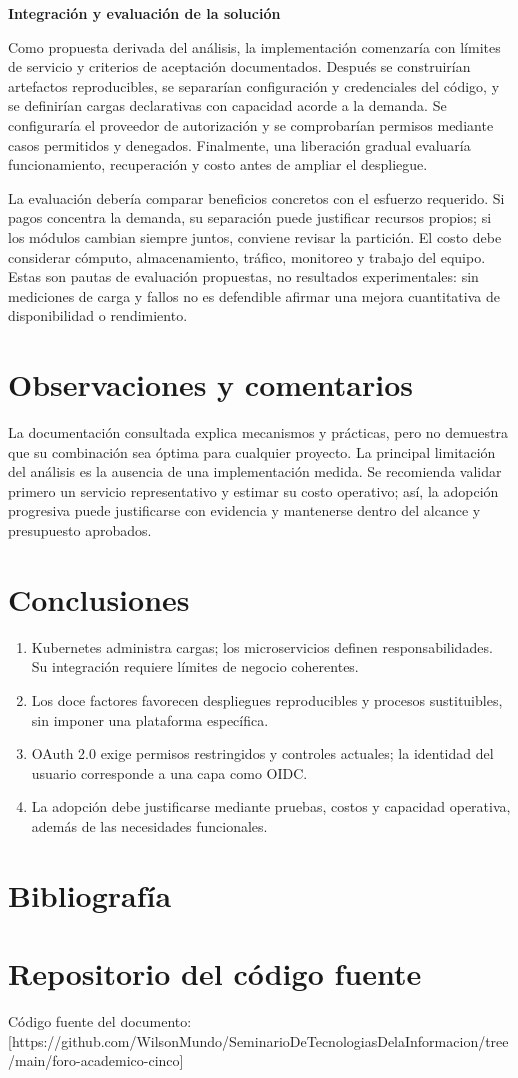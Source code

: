 \documentclass[12pt,letterpaper,onecolumn]{article}
\begin{document}
\textbf{Integración y evaluación de la solución}

Como propuesta derivada del análisis, la implementación comenzaría con límites de servicio y criterios de aceptación documentados. Después se construirían artefactos reproducibles, se separarían configuración y credenciales del código, y se definirían cargas declarativas con capacidad acorde a la demanda. Se configuraría el proveedor de autorización y se comprobarían permisos mediante casos permitidos y denegados. Finalmente, una liberación gradual evaluaría funcionamiento, recuperación y costo antes de ampliar el despliegue.

La evaluación debería comparar beneficios concretos con el esfuerzo requerido. Si pagos concentra la demanda, su separación puede justificar recursos propios; si los módulos cambian siempre juntos, conviene revisar la partición. El costo debe considerar cómputo, almacenamiento, tráfico, monitoreo y trabajo del equipo. Estas son pautas de evaluación propuestas, no resultados experimentales: sin mediciones de carga y fallos no es defendible afirmar una mejora cuantitativa de disponibilidad o rendimiento.

\section*{Observaciones y comentarios}
La documentación consultada explica mecanismos y prácticas, pero no demuestra que su combinación sea óptima para cualquier proyecto. La principal limitación del análisis es la ausencia de una implementación medida. Se recomienda validar primero un servicio representativo y estimar su costo operativo; así, la adopción progresiva puede justificarse con evidencia y mantenerse dentro del alcance y presupuesto aprobados.

\section*{Conclusiones}
\begin{enumerate}
\item Kubernetes administra cargas; los microservicios definen responsabilidades. Su integración requiere límites de negocio coherentes.
\item Los doce factores favorecen despliegues reproducibles y procesos sustituibles, sin imponer una plataforma específica.
\item OAuth 2.0 exige permisos restringidos y controles actuales; la identidad del usuario corresponde a una capa como OIDC.
\item La adopción debe justificarse mediante pruebas, costos y capacidad operativa, además de las necesidades funcionales.
\end{enumerate}

\section*{Bibliografía}
\printbibliography[heading=none]
\section*{Repositorio del código fuente}
Código fuente del documento: [https://github.com/WilsonMundo/SeminarioDeTecnologiasDelaInformacion/tree/main/foro-academico-cinco]
\end{document}
